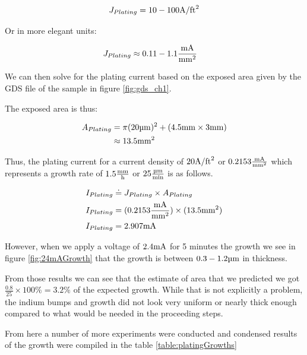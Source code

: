 $$
    J_{Plating} = 10-100 \jufeet
$$

Or in more elegant units:

\begin{equation}\notag
    \begin{split}
        J_{Plating} &\approx 0.11-1.1 \junits
    \end{split}
\end{equation}


We can then solve for the plating current based on the exposed area given by the GDS file of the sample in figure \ref{fig:gds_ch1}.


The exposed area is thus:

\begin{equation}\notag
    \begin{split}
        A_{Plating} &= \pi (20 \um)^2 + (4.5 \mm \times 3 \mm) \\
        &\approx 13.5 \sqmm
    \end{split}
\end{equation}

Thus, the plating current for a current density of $20\jufeet$ or $0.2153 \junits$ which represents a growth rate of $1.5\mmph $ or $25 \umpm$ is as follows.

\begin{equation}\notag
    \begin{split}
        I_{Plating} &\doteq J_{Plating} \times A_{Plating} \\
        I_{Plating} &= (0.2153 \junits) \times (13.5 \sqmm) \\
        I_{Plating} &= 2.907 \mA
    \end{split}
\end{equation}


However, when we apply a voltage of $2.4 \mA$ for 5 minutes the growth we see in figure \ref{fig:24mAGrowth} that the growth is between $0.3-1.2 \um$ in thickness.


From those results we can see that the estimate of area that we predicted we got $\frac{0.8}{25} \times 100\% = 3.2\%$ of the expected growth. While that is not explicitly a problem, the indium bumps and growth did not look very uniform or nearly thick enough compared to what would be needed in the proceeding steps.

From here a number of more experiments were conducted and condensed results of the growth were compiled in the table \ref{table:platingGrowths}


